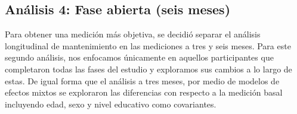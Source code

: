 \subsection{Análisis 4: Fase abierta (seis meses)}
Para obtener una medición más objetiva, se decidió separar el análisis longitudinal de mantenimiento en las mediciones a tres y seis meses. Para este segundo análisis, nos enfocamos únicamente en aquellos participantes que completaron todas las fases del estudio y exploramos sus cambios a lo largo de estas.
De igual forma que el análisis a tres meses, por medio de modelos de efectos mixtos se exploraron las diferencias con respecto a la medición basal incluyendo edad, sexo y nivel educativo como covariantes.

